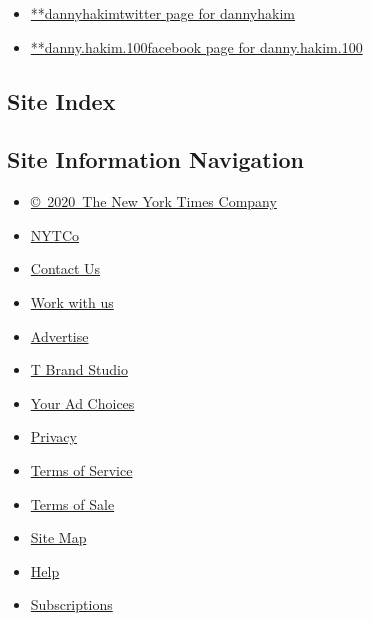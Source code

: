 \begin{itemize}
\tightlist
\item
  \href{https://twitter.com/dannyhakim}{**dannyhakimtwitter page for
  dannyhakim}
\item
  \href{https://www.facebook.com/danny.hakim.100}{**danny.hakim.100facebook
  page for danny.hakim.100}
\end{itemize}

\hypertarget{site-index}{%
\subsection{Site Index}\label{site-index}}

\hypertarget{site-information-navigation}{%
\subsection{Site Information
Navigation}\label{site-information-navigation}}

\begin{itemize}
\tightlist
\item
  \href{https://help.nytimes.com/hc/en-us/articles/115014792127-Copyright-notice}{©~2020~The
  New York Times Company}
\end{itemize}

\begin{itemize}
\tightlist
\item
  \href{https://www.nytco.com/}{NYTCo}
\item
  \href{https://help.nytimes.com/hc/en-us/articles/115015385887-Contact-Us}{Contact
  Us}
\item
  \href{https://www.nytco.com/careers/}{Work with us}
\item
  \href{https://nytmediakit.com/}{Advertise}
\item
  \href{http://www.tbrandstudio.com/}{T Brand Studio}
\item
  \href{https://www.nytimes.com/privacy/cookie-policy\#how-do-i-manage-trackers}{Your
  Ad Choices}
\item
  \href{https://www.nytimes.com/privacy}{Privacy}
\item
  \href{https://help.nytimes.com/hc/en-us/articles/115014893428-Terms-of-service}{Terms
  of Service}
\item
  \href{https://help.nytimes.com/hc/en-us/articles/115014893968-Terms-of-sale}{Terms
  of Sale}
\item
  \href{https://spiderbites.nytimes.com}{Site Map}
\item
  \href{https://help.nytimes.com/hc/en-us}{Help}
\item
  \href{https://www.nytimes.com/subscription?campaignId=37WXW}{Subscriptions}
\end{itemize}
